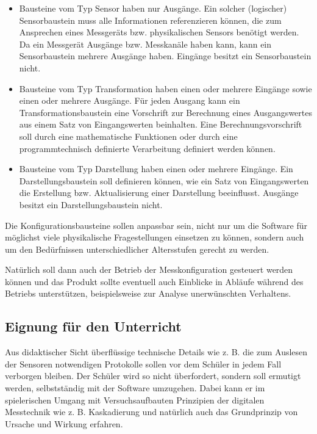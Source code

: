 \documentclass[parskip=full]{scrartcl}
\begin{document}
\begin{itemize}
	
	\item Bausteine vom Typ Sensor haben nur Ausgänge. Ein solcher (logischer) Sensorbaustein muss alle Informationen referenzieren können, die zum Ansprechen eines Messgeräts bzw. physikalischen Sensors benötigt werden. Da ein Messgerät Ausgänge bzw. Messkanäle haben kann, kann ein Sensorbaustein mehrere Ausgänge haben. Eingänge besitzt ein Sensorbaustein nicht. 
	
	\item Bausteine vom Typ Transformation haben einen oder mehrere Eingänge sowie einen oder mehrere Ausgänge. Für jeden Ausgang kann  ein Transformationsbaustein eine Vorschrift zur Berechnung eines Ausgangswertes aus einem Satz von Eingangswerten beinhalten. Eine Berechnungsvorschrift soll durch eine mathematische Funktionen oder durch eine programmtechnisch definierte Verarbeitung definiert werden können.
	
	\item Bausteine vom Typ Darstellung haben einen oder mehrere Eingänge. Ein Darstellungsbaustein soll definieren können, wie ein Satz von Eingangswerten die Erstellung bzw. Aktualisierung einer Darstellung beeinflusst. Ausgänge besitzt ein Darstellungsbaustein nicht. 
	
\end{itemize}

Die Konfigurationsbausteine sollen anpassbar sein, nicht nur um die Software für möglichst viele physikalische Fragestellungen einsetzen zu können, sondern auch um den Bedürfnissen unterschiedlicher Altersstufen gerecht zu werden. 

Natürlich soll dann auch der Betrieb der Messkonfiguration gesteuert werden können und das Produkt sollte eventuell auch Einblicke in Abläufe während des Betriebs unterstützen, beispielsweise zur Analyse unerwünschten Verhaltens.

\subsection{Eignung für den Unterricht}

Aus didaktischer Sicht überflüssige technische Details wie z. B. die zum Auslesen der Sensoren notwendigen Protokolle sollen vor dem Schüler in jedem Fall verborgen bleiben.
Der Schüler wird so nicht überfordert, sondern soll ermutigt werden, selbstständig mit der Software umzugehen. 
Dabei kann er im spielerischen Umgang mit Versuchsaufbauten Prinzipien der digitalen Messtechnik wie z. B. Kaskadierung und natürlich auch das Grundprinzip von Ursache und Wirkung erfahren.
\end{document}
